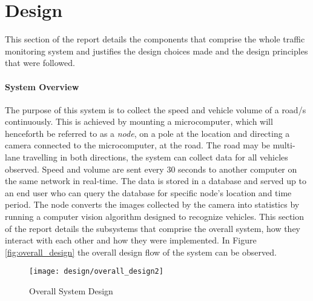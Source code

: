 \chapter{Design}

This section of the report details the components that comprise the whole traffic monitoring system and justifies the design choices made and the design principles that were followed.

\subsubsection{System Overview}

The purpose of this system is to collect the speed and vehicle volume of a road/s continuously. This is achieved by mounting a microcomputer, which will henceforth be referred to as a \emph{node}, on a pole at the location and directing a camera connected to the microcomputer, at the road. The road may be multi-lane travelling in both directions, the system can collect data for all vehicles observed. Speed and volume are sent every 30 seconds to another computer on the same network in real-time. The data is stored in a database and served up to an end user who can query the database for specific node's location and time period. The node converts the images collected by the camera into statistics by running a computer vision algorithm designed to recognize vehicles. This section of the report details the subsystems that comprise the overall system, how they interact with each other and how they were implemented. In Figure \ref{fig:overall_design} the overall design flow of the system can be observed. 

\begin{figure}[H]
    \centering
    \texttt{[image: design/overall\_design2]}
    \caption{Overall System Design}
    \label{fig:overall_design2}
\end{figure}









